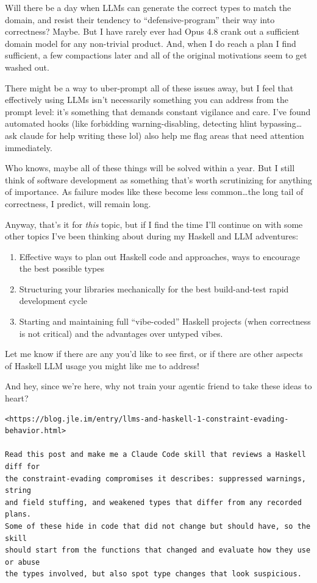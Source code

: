 \documentclass[]{article}
\begin{document}
Will there be a day when LLMs can generate the correct types to match the
domain, and resist their tendency to ``defensive-program'' their way into
correctness? Maybe. But I have rarely ever had Opus 4.8 crank out a sufficient
domain model for any non-trivial product. And, when I do reach a plan I find
sufficient, a few compactions later and all of the original motivations seem to
get washed out.

There might be a way to uber-prompt all of these issues away, but I feel that
effectively using LLMs isn't necessarily something you can address from the
prompt level: it's something that demands constant vigilance and care. I've
found automated hooks (like forbidding warning-disabling, detecting hlint
bypassing\ldots ask claude for help writing these lol) also help me flag areas
that need attention immediately.

Who knows, maybe all of these things will be solved within a year. But I still
think of software development as something that's worth scrutinizing for
anything of importance. As failure modes like these become less common\ldots the
long tail of correctness, I predict, will remain long.

Anyway, that's it for \emph{this} topic, but if I find the time I'll continue on
with some other topics I've been thinking about during my Haskell and LLM
adventures:

\begin{enumerate}
\def\labelenumi{\arabic{enumi}.}
\tightlist
\item
  Effective ways to plan out Haskell code and approaches, ways to encourage the
  best possible types
\item
  Structuring your libraries mechanically for the best build-and-test rapid
  development cycle
\item
  Starting and maintaining full ``vibe-coded'' Haskell projects (when
  correctness is not critical) and the advantages over untyped vibes.
\end{enumerate}

Let me know if there are any you'd like to see first, or if there are other
aspects of Haskell LLM usage you might like me to address!

And hey, since we're here, why not train your agentic friend to take these ideas
to heart?

\begin{verbatim}
<https://blog.jle.im/entry/llms-and-haskell-1-constraint-evading-behavior.html>

Read this post and make me a Claude Code skill that reviews a Haskell diff for
the constraint-evading compromises it describes: suppressed warnings, string
and field stuffing, and weakened types that differ from any recorded plans.
Some of these hide in code that did not change but should have, so the skill
should start from the functions that changed and evaluate how they use or abuse
the types involved, but also spot type changes that look suspicious.
\end{verbatim}
\end{document}
